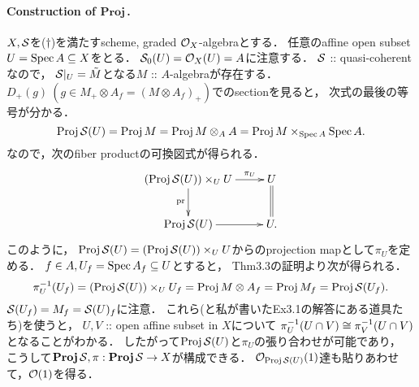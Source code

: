 \documentclass[a4paper]{jsarticle}
\newcommand{\gProj}{\mathbf{Proj}\,}
\begin{document}
    \paragraph{Construction of $\gProj$.}
    $X, \mathcal{S}$を($\dagger$)を満たすscheme, graded $\mathcal{O}_X$-algebraとする．
    任意のaffine open subset $U=\operatorname{Spec} A \subseteq X$をとる．
    $\mathcal{S}_0(U)=\mathcal{O}_X(U)=A$に注意する．
    $\mathcal{S}$ :: quasi-coherentなので，
    $\mathcal{S}|_U=\tilde{M}$となる$M$ :: $A$-algebraが存在する．
    $D_+(g) ~(g \in M_+ \otimes A_f=(M \otimes A_f)_+)$でのsectionを見ると，
    次式の最後の等号が分かる．
    \[ \operatorname{Proj} \mathcal{S}(U)=\operatorname{Proj} M=\operatorname{Proj} M \otimes_A A=\operatorname{Proj} M \times_{\operatorname{Spec} A} \operatorname{Spec} A. \]
    なので，次のfiber productの可換図式が得られる．
    \[
        \xymatrix
        {
            (\Proj \shS(U)) \times_U U \ar[r]^-{\pi_U} \ar[d]_-{\pr}& U \ar@{=}[d] \\
            \Proj \shS(U) \ar[r]& U.
        }
    \]
    このように，
    $\operatorname{Proj} \mathcal{S}(U)=(\operatorname{Proj} \mathcal{S}(U)) \times_U U$からのprojection mapとして$\pi_U$を定める．
    $f \in A, U_f=\operatorname{Spec} A_f \subseteq U$とすると，
    Thm3.3の証明より次が得られる．
    \[ \pi_U^{-1}(U_f)=(\operatorname{Proj} \mathcal{S}(U)) \times_U U_f=\operatorname{Proj} M \otimes A_f=\operatorname{Proj} M_f=\operatorname{Proj} \mathcal{S}(U_f). \]
    $\mathcal{S}(U_f)=M_f=\mathcal{S}(U)_f$に注意．
    これら(と私が書いたEx3.1の解答にある道具たち)を使うと，
    $U,V$ :: open affine subset in $X$について
    $\pi_U^{-1}(U \cap V) \cong \pi_V^{-1}(U \cap V)$となることがわかる．
    したがって$\operatorname{Proj} \mathcal{S}(U)$と$\pi_U$の張り合わせが可能であり，
    こうして$\gProj \shS, \pi: \gProj \shS \to X$が構成できる．
    $\mathcal{O}_{\operatorname{Proj} \mathcal{S}(U)}(1)$達も貼りあわせて，$\mathcal{O}(1)$を得る．
\end{document}

